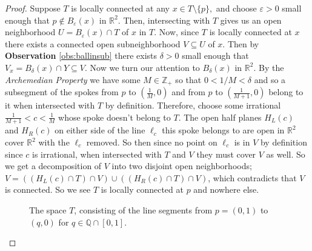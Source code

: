 \documentclass[addpoints,10pt]{exam}
\theoremstyle{plain}
\theoremstyle{definition}
\theoremstyle{plain}
\theoremstyle{definition}
\newcommand{\RR}{\ensuremath{\mathbb{R}}}
\newcommand{\ZZ}{\ensuremath{\mathbb{Z}}}
\begin{document}
\begin{proof}
Suppose $T$ is locally connected at any $x\in T\setminus\{p\},$ and choose $\varepsilon>0$ small enough that $p\not\in B_{\varepsilon}(x)$ in $\RR^{2}.$ Then, intersecting with $T$ gives us an open neighborhood $U=B_{\varepsilon}(x)\cap T$ of $x$ in $T$. Now, since $T$ is locally connected at $x$ there exists a connected open subneighborhood $V\subseteq U$ of $x.$ Then by \textbf{Observation }\ref{obs:ballinsub} there exists $\delta>0$ small enough that $V_{x}=B_{\delta}(x)\cap Y\subseteq V$. Now we turn our attention to $B_{\delta}(x)$ in $\RR^{2}.$ By the \textit{Archemedian Property} we have some $M\in \ZZ_{+}$ so that $0<1/M<\delta$ and so a subsegment of the spokes from $p$ to $(\frac{1}{M},0)$ and from $p$ to $(\frac{1}{M+1},0)$ belong to it when intersected with $T$ by definition. Therefore, choose some irrational $\frac{1}{M+1}<c<\frac{1}{M}$ whose spoke doesn't belong to $T.$ The open half planes $H_{L}(c)$ and $H_{R}(c)$ on either side of the line $\ell_{c}$ this spoke belongs to are open in $\RR^{2}$ cover $\RR^{2}$ with the $\ell_{c}$ removed. So then since no point on $\ell_{c}$ is in $V$ by definition since $c$ is irrational, when intersected with $T$ and $V$ they must cover $V$ as well. So we get a decomposition of $V$ into two disjoint open neighborhoods; $V=((H_{L}(c)\cap T)\cap V)\cup ((H_{R}(c)\cap T)\cap V)$, which contradicts that $V$ is connected. So we see $T$ is locally connected at $p$ and nowhere else.

\begin{figure}[h]
    \centering
    \caption{The space $T$, consisting of the line segments from
    $p=(0,1)$ to $(q,0)$ for $q\in\mathbb{Q}\cap[0,1]$.}
\end{figure}


\end{proof}
\end{document}
